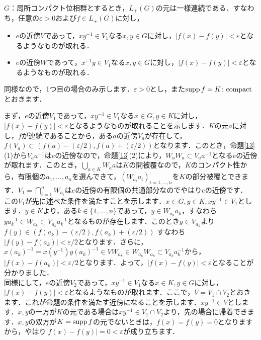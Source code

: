 \begin{yprop}\label{16}
$G$：局所コンパクト位相群とするとき，$L_{+}(G)$の元は一様連続である．すなわち，任意の$\varepsilon>0$および$f \in L_{+}(G)$に対し，
\begin{itemize}
 \item $e$の近傍$V$であって，$xy^{-1} \in V_1$なる$x, y \in G$に対し，$|f(x)-f(y)|<\varepsilon$となるようなものが取れる．
 \item $e$の近傍$W$であって，$x^{-1}y \in V_1$なる$x, y \in G$に対し，$|f(x)-f(y)|<\varepsilon$となるようなものが取れる．
\end{itemize}
\end{yprop}
\begin{Proof}
同様なので，1つ目の場合のみ示します．$\varepsilon>0$とし，また$\operatorname{supp} f=K \colon \mathrm{compact}$とおきます．

まず，$e$の近傍$V_1$であって，$xy^{-1} \in V_1$なる$x \in G, y \in K$に対し，$|f(x)-f(y)|<\varepsilon$となるようなものが取れることを示します．$K$の元$a$に対し，$f$が連続であることから，ある$a$の近傍$V_a$が存在して，$f(V_a) \subset (f(a)-(\varepsilon /2), f(a)+(\varepsilon /2) )$となります．このとき，命題\ref{13}(1)から$V_{a}a^{-1}$は$e$の近傍なので，命題\ref{13}(2)により，$W_{a}W_{a} \subset V_{a}a^{-1}$となる$e$の近傍が取れます．このとき，$\bigcup_{a \in K}{W_a}a$は$K$の開被覆なので，$K$のコンパクト性から，有限個の$a_1, \ldots, a_n$を選んできて，$( W_{a_i}a_{i} )_{i=1,\ldots,n}$を$K$の部分被覆とできます．$V_1=\bigcap_{i=1}^{n}W_{a_i}$は$e$の近傍の有限個の共通部分なのでやはり$e$の近傍です．\\

この$V_1$が先に述べた条件を満たすことを示します．$x \in G, y \in K, xy^{-1} \in V_1$とします．$y \in K$より，ある$k \in \{1, \ldots , n \}$であって，$y \in W_{a_k}a_{k}$，すなわち$ya_{k}^{-1} \in W_{a_k} \subset V_{a_k}a_{k}^{-1}$となるものが存在します．このとき$y \in V_{a_k}$より$f(y) \in (f(a_k)-(\varepsilon/2), f(a_k)+(\varepsilon /2) )$ すなわち $|f(y)-f(a_k)|<\varepsilon /2$となります．さらに，$x(a_k)^{-1}=x(y^{-1})y(a_k)^{-1} \in VW_{a_k} \in W_{a_k}W_{a_k} \subset V_{a_k}a_{k}^{-1}$から，$|f(x)-f(a_k)|<\varepsilon /2$となります．よって，$|f(x)-f(y)|<\varepsilon$となることが分かりました．\\

同様にして，$e$の近傍$V_2$であって，$xy^{-1} \in V_1$なる$x \in K, y \in G$に対し，$|f(x)-f(y)|<\varepsilon$となるようなものが取れます．ここで，$V=V_1 \cap V_2$とおきます．これが命題の条件を満たす近傍になることを示します．$xy^{-1} \in V$とします．$x,y$の一方が$K$の元である場合は$xy^{-1} \in V_1 \cap V_2$より，先の場合に帰着できます．$x,y$の双方が$K=\operatorname{supp} f$の元でないときは，$f(x)=f(y)=0$となりますから，やはり$|f(x)-f(y)|=0<\varepsilon$が成り立ちます．　
\end{Proof}

